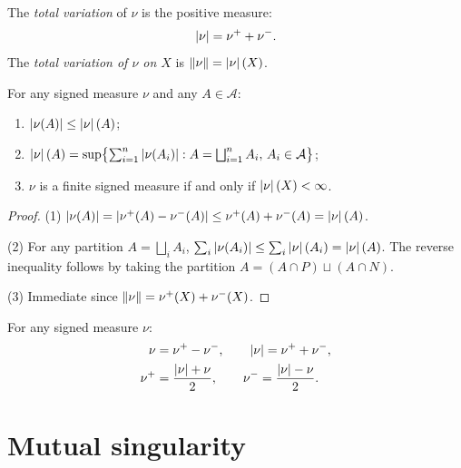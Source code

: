 \begin{definition}
\label{def:total_variation}
The \emph{total variation} of $\nu$ is the positive measure:
\[
    \left| \nu \right| = \nu^+ + \nu^-.
\]
The \emph{total variation of $\nu$ on $X$} is $\left\| \nu \right\| = \left| \nu \right|(X)$.
\end{definition}

\begin{proposition}
For any signed measure $\nu$ and any $A \in \mathcal{A}$:
\begin{enumerate}
    \item $\left| \nu(A) \right| \leq \left| \nu \right|(A)$;
    \item $\left| \nu \right|(A) = \sup\bigl\{\sum_{i=1}^n \left| \nu(A_i) \right| :
    A = \bigsqcup_{i=1}^n A_i,\, A_i \in \mathcal{A}\bigr\}$;
    \item $\nu$ is a finite signed measure if and only if $\left| \nu \right|(X) < \infty$.
\end{enumerate}
\end{proposition}

\begin{proof}
(1) $\left| \nu(A) \right| = \left| \nu^+(A) - \nu^-(A) \right| \leq \nu^+(A) + \nu^-(A) = \left| \nu \right|(A)$.

(2) For any partition $A = \bigsqcup_i A_i$,
$\sum_i \left| \nu(A_i) \right| \leq \sum_i \left| \nu \right|(A_i) = \left| \nu \right|(A)$.
The reverse inequality follows by taking the partition $A = (A \cap P) \sqcup (A \cap N)$.

(3) Immediate since $\left\| \nu \right\| = \nu^+(X) + \nu^-(X)$.
\end{proof}

\begin{keyformulas}[title=\textbf{Summary: Jordan decomposition}]
For any signed measure $\nu$:
\begin{align*}
    \nu &= \nu^+ - \nu^-, \qquad \left| \nu \right| = \nu^+ + \nu^-, \\
    \nu^+ &= \frac{\left| \nu \right| + \nu}{2}, \qquad
    \nu^- = \frac{\left| \nu \right| - \nu}{2}.
\end{align*}
\end{keyformulas}

\section{Mutual singularity}

